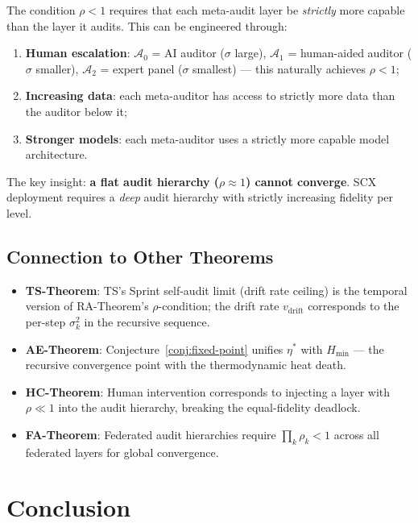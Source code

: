 \documentclass[12pt,a4paper]{article}
\newcommand{\cA}{\mathcal{A}}
\begin{document}
The condition $\rho<1$ requires that each meta-audit layer be \emph{strictly}
more capable than the layer it audits.  This can be engineered through:
\begin{enumerate}[label=(\roman*)]
    \item \textbf{Human escalation}: $\cA_0$ = AI auditor ($\sigma$ large),
          $\cA_1$ = human-aided auditor ($\sigma$ smaller),
          $\cA_2$ = expert panel ($\sigma$ smallest) — this naturally achieves
          $\rho<1$;
    \item \textbf{Increasing data}: each meta-auditor has access to strictly
          more data than the auditor below it;
    \item \textbf{Stronger models}: each meta-auditor uses a strictly more
          capable model architecture.
\end{enumerate}
The key insight: \textbf{a flat audit hierarchy ($\rho\approx1$) cannot
converge}.  SCX deployment requires a \emph{deep} audit hierarchy with
strictly increasing fidelity per level.

\subsection{Connection to Other Theorems}

\begin{itemize}
    \item \textbf{TS-Theorem}: TS's Sprint self-audit limit (drift rate
          ceiling) is the temporal version of RA-Theorem's $\rho$-condition;
          the drift rate $v_{\mathrm{drift}}$ corresponds to the per-step
          $\sigma_k^2$ in the recursive sequence.
    \item \textbf{AE-Theorem}: Conjecture~\ref{conj:fixed-point} unifies
          $\eta^*$ with $H_{\min}$ — the recursive convergence point with the
          thermodynamic heat death.
    \item \textbf{HC-Theorem}: Human intervention corresponds to injecting a
          layer with $\rho\ll1$ into the audit hierarchy, breaking the
          equal-fidelity deadlock.
    \item \textbf{FA-Theorem}: Federated audit hierarchies require
          $\prod_{k}\rho_k<1$ across all federated layers for global
          convergence.
\end{itemize}

\section{Conclusion}
\end{document}
